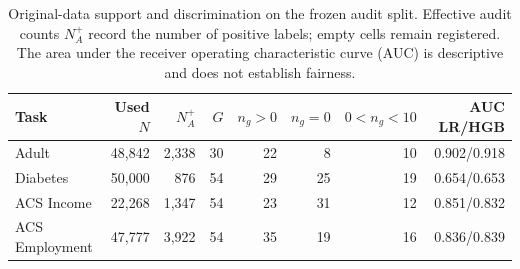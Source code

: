 \begin{table}[t]
\centering\small
\caption{Original-data support and discrimination on the frozen audit split. Effective audit counts $N^+_A$ record the number of positive labels; empty cells remain registered. The area under the receiver operating characteristic curve (AUC) is descriptive and does not establish fairness.}\label{tab:data}
\begin{tabular}{lrrrrrrr}
\toprule
Task & Used $N$ & $N^+_A$ & $G$ & $n_g>0$ & $n_g=0$ & $0<n_g<10$ & AUC LR/HGB \\
\midrule
Adult & 48,842 & 2,338 & 30 & 22 & 8 & 10 & 0.902/0.918 \\
Diabetes & 50,000 & 876 & 54 & 29 & 25 & 19 & 0.654/0.653 \\
ACS Income & 22,268 & 1,347 & 54 & 23 & 31 & 12 & 0.851/0.832 \\
ACS Employment & 47,777 & 3,922 & 54 & 35 & 19 & 16 & 0.836/0.839 \\
\bottomrule
\end{tabular}
\end{table}
